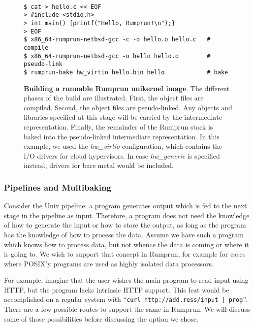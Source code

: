 \begin{figure}[t]
{\tt \scriptsize
\begin{verbatim}
$ cat > hello.c << EOF
> #include <stdio.h>
> int main() {printf("Hello, Rumprun!\n");}
> EOF
$ x86_64-rumprun-netbsd-gcc -c -o hello.o hello.c   # compile
$ x86_64-rumprun-netbsd-gcc -o hello hello.o        # pseudo-link
$ rumprun-bake hw_virtio hello.bin hello            # bake
\end{verbatim}}
\caption[Building a runnable Rumprun unikernel image]
{\textbf{Building a runnable Rumprun unikernel image}.
The different phases of the build are illustrated.  First, the object
files are compiled.  Second, the object files are pseudo-linked.
Any objects and libraries specified at this stage will be carried by
the intermediate representation.  Finally, the remainder of the Rumprun
stack is baked into the pseudo-linked intermediate representation.
In this example, we used the \textit{hw\_virtio} configuration,
which contains the I/O drivers for cloud hypervisors.  In case
\textit{hw\_generic} is specified instead, drivers for bare metal
would be included.
}
\label{fig:rumprun-buildexample}
\end{figure}

\subsubsection*{Pipelines and Multibaking}

Consider the Unix pipeline: a program generates output which is fed to the
next stage in the pipeline as input.  Therefore, a program does not need
the knowledge of how to generate the input or how to store the output,
as long as the program has the knowledge of how to process the data.
Assume we have such a program which knows how to process data, but not
whence the data is coming or where it is going to.  We wish to support
that concept in Rumprun, for example for cases where POSIX'y programs
are used as highly isolated data processors.

For example, imagine that the user wishes the main program to read input
using HTTP, but the program lacks intrinsic HTTP support.  This feat would
be accomplished on a regular system with \eg
``\verb+curl http://add.ress/input | prog+''.
There are a few possible routes to support the same in Rumprun.  We will
discuss some of those possibilities before discussing the option we chose.

